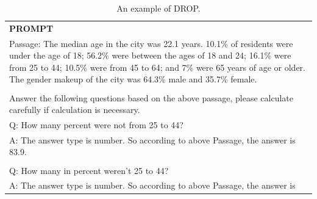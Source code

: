 
\begin{table}[h]
    \centering \small
\begin{tabular}{p{12cm}}
\toprule
\textbf{PROMPT}\\
Passage: The median age in the city was 22.1 years. 10.1\% of residents were under the age of 18; 56.2\% were between the ages of 18 and 24; 16.1\% were from 25 to 44; 10.5\% were from 45 to 64; and 7\% were 65 years of age or older. The gender makeup of the city was 64.3\% male and 35.7\% female.
\\
\\Answer the following questions based on the above passage, please calculate carefully if calculation is necessary.
\\Q: How many percent were not from 25 to 44?
\\A: The answer type is number. So according to above Passage, the answer is 83.9.
\\
\\Q: How many in percent weren't 25 to 44?
\\A: The answer type is number. So according to above Passage, the answer is\\
\bottomrule
\end{tabular}
    \caption{\centering An example of DROP.}
    \label{tab:drop_eval_format_example}
\end{table}

